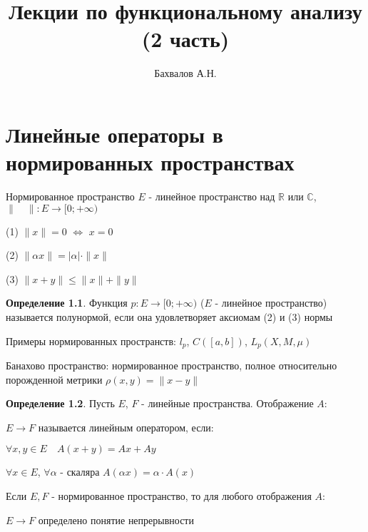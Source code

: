 \documentclass[a4paper,12pt]{report}
\author{Бахвалов А.Н.}
\title{Лекции по функциональному анализу\\(2 часть)}
\begin{document}
\large

\maketitle
\theoremstyle{definition}
\newtheorem*{df}{Определение}
\theoremstyle{plain}
\newtheorem{thm}{Теорема}[chapter]
\theoremstyle{plain}
\newtheorem{lem}{Лемма}[chapter]
\theoremstyle{plain}
\newtheorem*{aks}{Аксиома}
\theoremstyle{remark}
\newtheorem*{rem}{Замечание}
\theoremstyle{remark}
\newtheorem*{ex}{Пример}
\theoremstyle{plain}
\newtheorem*{cons}{Следствие}
\theoremstyle{plain}
\newtheorem{prop}{Предложение}[chapter]

\setcounter{chapter}{14}



\chapter{Линейные операторы в нормированных пространствах}

\noindent Нормированное пространство $E$ - линейное пространство над $\mathbb R$ или $\mathbb C$,\\ $\|\quad\|\colon E\to[0;+\infty)$

(1) $\|x\|=0$ $\Leftrightarrow$ $x=0$

(2) $\|\alpha x\|=|\alpha|\cdot\|x\|$

(3) $\|x+y\|\le\|x\|+\|y\|$


\begin{df}
Функция $p\colon E\to[0;+\infty)$ ($E$ - линейное пространство) называется полунормой, если она удовлетворяет аксиомам (2) и (3) нормы
\end{df}

\noindent Примеры нормированных пространств: $l_p$, $C([a,b])$, $L_p(X,M,\mu)$
 

\noindent Банахово пространство: нормированное пространство, полное относительно порожденной метрики $\rho(x,y)=\|x-y\|$

\begin{df} Пусть $E$, $F$ - линейные пространства. Отображение $A\colon$

\noindent $E\to F$ называется линейным оператором, если:

 $\forall x,y\in E\quad A(x+y)=Ax+Ay$

$\forall x\in E$, $\forall\alpha$ - скаляра $A(\alpha x)=\alpha\cdot A(x)$

\noindent Если $E,F$ - нормированное пространство, то для любого отображения $A\colon$ 

\noindent$E\to F$ определено понятие непрерывности
\end{df}
\end{document}
